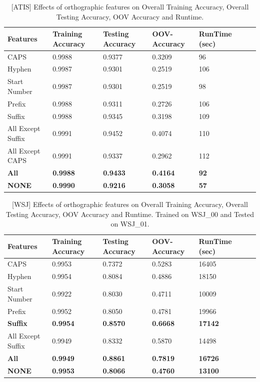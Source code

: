 \begin{center}	
	\begin{table}[ht]
  	\centering
   	\begin{tabular}{| l | l | l | l | l | l | l |}
    	\hline
        Features & Training Accuracy & Testing Accuracy & OOV-Accuracy & RunTime (sec) \\ \hline
	CAPS & 0.9988	 & 0.9377 & 0.3209 &  96 \\ \hline
	Hyphen & 0.9987 & 0.9301 & 0.2519 & 106 \\ \hline
	Start Number & 0.9987 & 0.9301 & 0.2519 & 98 \\ \hline
	Prefix & 0.9988 & 0.9311 & 0.2726 & 106 \\ \hline
	Suffix & 0.9988 & 0.9345 & 0.3198 & 109 \\ \hline
	All Except Suffix & 0.9991 & 0.9452 & 0.4074 & 110 \\ \hline
	All Except CAPS & 0.9991 & 0.9337 & 0.2962 & 112 \\ \hline
	\textbf{All} & \textbf{0.9988} & \textbf{0.9433} & \textbf{0.4164} & \textbf{92} \\ \hline
 	\textbf{NONE} & \textbf{0.9990} & \textbf{0.9216} & \textbf{0.3058}  & \textbf{57} \\ \hline
    	\end{tabular}
    	\caption{[ATIS] Effects of orthographic features on Overall Training Accuracy, Overall Testing Accuracy, OOV Accuracy and Runtime.}
    	\end{table}%
\end{center}

\begin{center}	
	\begin{table}[ht]
  	\centering
   	\begin{tabular}{| l | l | l | l | l | l | l |}
    	\hline
        Features & Training Accuracy & Testing Accuracy & OOV-Accuracy & RunTime (sec) \\ \hline
	CAPS & 0.9953 & 0.7372  & 0.5283 & 16405 \\ \hline
	Hyphen & 0.9954 & 0.8084 & 0.4886 & 18150 \\ \hline
	Start Number & 0.9922 & 0.8030 & 0.4711 & 10009  \\ \hline
	Prefix & 0.9952 & 0.8050 & 0.4781 & 19966 \\ \hline
	\textbf{Suffix} & \textbf{0.9954} & \textbf{0.8570} & \textbf{0.6668} & \textbf{17142} \\ \hline
	All Except Suffix & 0.9949 & 0.8332 & 0.5870 & 14498 \\ \hline
	\textbf{All} & \textbf{0.9949} & \textbf{0.8861} & \textbf{0.7819} & \textbf{16726} \\ \hline
	\textbf{NONE} & \textbf{0.9953} & \textbf{0.8066} & \textbf{0.4760} & \textbf{13100} \\ \hline	
    	\end{tabular}
    	\caption{[WSJ] Effects of orthographic features on Overall Training Accuracy, Overall Testing Accuracy, OOV Accuracy and Runtime. Trained on WSJ\_00 and Tested on WSJ\_01.}
    	\end{table}%
\end{center}

